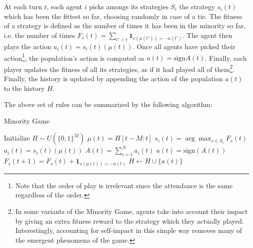 \documentclass[a4paper, amsfonts, amssymb, amsmath, reprint, showkeys, nofootinbib, twoside]{revtex4-1}
\begin{document}
At each turn $t$, each agent $i$ picks amongs its strategies $S_i$ the strategy $s_i(t)$ which has been the fittest so far, choosing randomly in case of a tie. The fitness of a strategy is defined as the number of times it has been in the minority so far, i.e. the number of times $F_s(t) = \sum_{t' < t} \mathbf{1}_{s(\mu(t')) = -a(t')}$. The agent then plays the action $a_i(t) = s_i(t)(\mu(t))$. Once all agents have picked their action\footnote{Note that the order of play is irrelevant since the attendance is the same regardless of the order.}, the population's action is computed as $a(t) = \text{sign}A(t)$. Finally, each player updates the fitness of all its strategies, as if it had played all of them\footnote{In some variants of the Minority Game, agents take into account their impact by giving an extra fitness reward to the strategy which they actually played. Interestingly, accounting for self-impact in this simple way removes many of the emergent phenomena of the game.}. Finally, the history is updated by appending the action of the population $a(t)$ to the history $H$.

The above set of rules can be summarized by the following algorithm:
\begin{algorithm}
    \caption{Minority Game}
    \label{alg:minority-game}
    \begin{algorithmic}[1]
        \State Initialize $H \sim U(\{0, 1\} ^M)$
            \State $\mu(t) = H[t-M:t]$
                \State $s_i(t) = \arg\max_{s \in S_i} F_s(t)$
                \State $a_i(t) = s_i(t)(\mu(t))$
            \EndFor
            \State $A(t) = \sum_{i=1}^N a_i(t)$
            \State $a(t) = \text{sign}(A(t))$
                    \State $F_s(t+1) = F_s(t) + \mathbf{1}_ {s(\mu(t)) = -a(t)}$
                \EndFor
            \EndFor
            \State $H \gets H \cup \{a(t)\}$
        \EndFor
    \end{algorithmic}
\end{algorithm}
\end{document}
